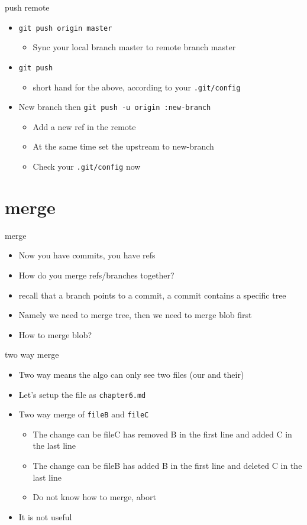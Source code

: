 \documentclass[aspectratio=169]{beamer}
\newcommand{\T}[1]{\texttt{#1}}
\begin{document}
\begin{frame}{push remote}
  \begin{itemize}
    \item<1-> \T{git push origin master}\begin{itemize}
      \item Sync your local branch master to remote branch master
    \end{itemize}
    \item<2-> \T{git push}\begin{itemize}
      \item short hand for the above, according to your \T{.git/config}
    \end{itemize}
    \item<3-> New branch then \T{git push -u origin :new-branch}\begin{itemize}
      \item Add a new ref in the remote
      \item At the same time set the upstream to new-branch
      \item Check your \T{.git/config} now
    \end{itemize}
  \end{itemize}
\end{frame}

\section{merge}
\begin{frame}{merge}
  \begin{itemize}
    \item Now you have commits, you have refs
    \item How do you merge refs/branches together?
    \item recall that a branch points to a commit, a commit contains a specific tree
    \item Namely we need to merge tree, then we need to merge blob first
    \item How to merge blob?
  \end{itemize}
\end{frame}

\begin{frame}{two way merge}
  \begin{itemize}
    \item Two way means the algo can only see two files (our and their)
    \item Let's setup the file as \T{chapter6.md}
    \item Two way merge of \T{fileB} and \T{fileC}\begin{itemize}
      \item The change can be fileC has removed B in the first line and added C in the last line
      \item The change can be fileB has added B in the first line and deleted C in the last line
      \item Do not know how to merge, abort
    \end{itemize}
    \item It is not useful
  \end{itemize}
\end{frame}
\end{document}
